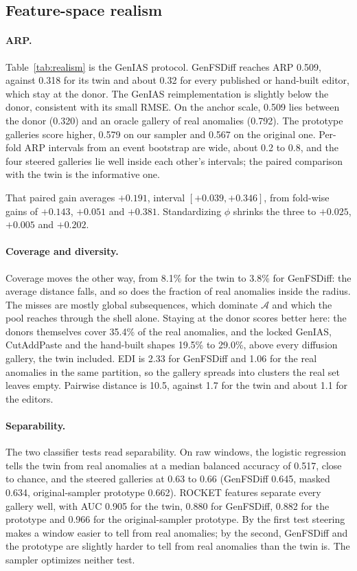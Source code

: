 \documentclass[11pt,a4paper]{article}
\newcommand{\phivec}{\phi}                 %
\newcommand{\setA}{\mathcal{A}}            %
\begin{document}
\subsection{Feature-space realism}
\label{sec:realism}

\paragraph{ARP.}
Table~\ref{tab:realism} is the GenIAS protocol. GenFSDiff reaches ARP 0.509,
against 0.318 for its twin and about 0.32 for every published or hand-built
editor, which stay at the donor. The GenIAS reimplementation is slightly below
the donor, consistent with its small RMSE. On the anchor scale, 0.509 lies
between the donor (0.320) and an oracle gallery of real anomalies (0.792). The
prototype galleries score higher, 0.579 on our sampler and 0.567 on the
original one. Per-fold ARP intervals from an event bootstrap are wide, about
0.2 to 0.8, and the four steered galleries lie well inside each other's
intervals; the paired comparison with the twin is the informative one.

That paired gain averages $+0.191$, interval $[+0.039, +0.346]$, from
fold-wise gains of $+0.143$, $+0.051$ and $+0.381$. Standardizing $\phivec$
shrinks the three to $+0.025$, $+0.005$ and $+0.202$.

\paragraph{Coverage and diversity.}
Coverage moves the other way, from 8.1\% for the twin to 3.8\% for GenFSDiff:
the average distance falls, and so does the fraction of real anomalies inside
the radius. The misses are mostly global subsequences, which dominate $\setA$
and which the pool reaches through the shell alone. Staying at the donor scores better here:
the donors themselves cover 35.4\% of the real anomalies, and the locked
GenIAS, CutAddPaste and the hand-built shapes 19.5\% to 29.0\%, above every
diffusion gallery, the twin included. EDI is 2.33 for GenFSDiff and 1.06 for
the real anomalies in the same partition, so the gallery spreads into clusters
the real set leaves empty. Pairwise distance is 10.5, against 1.7 for the twin
and about 1.1 for the editors.

\paragraph{Separability.}
The two classifier tests read separability. On raw windows, the logistic
regression tells the twin from real anomalies at a median balanced accuracy of
0.517, close to chance, and the steered galleries at 0.63 to 0.66 (GenFSDiff
0.645, masked 0.634, original-sampler prototype 0.662). ROCKET features
separate every gallery well, with AUC 0.905 for the twin, 0.880 for GenFSDiff,
0.882 for the prototype and 0.966 for the original-sampler prototype. By the
first test steering makes a window easier to tell from real anomalies; by the
second, GenFSDiff and the prototype are slightly harder to tell from real
anomalies than the twin is. The sampler optimizes neither test.
\end{document}
